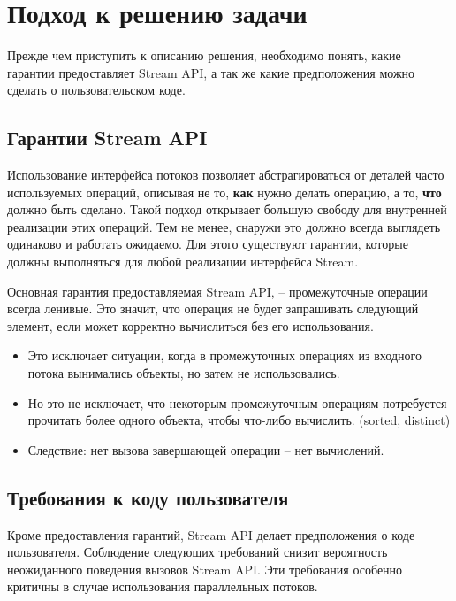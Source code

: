 \section{Подход к решению задачи}\label{chapter2}
Прежде чем приступить к описанию решения, необходимо понять, какие гарантии предоставляет Stream API, а так же какие предположения можно сделать о пользовательском коде.

\subsection{Гарантии Stream API}\label{java:guarantees}
Использование интерфейса потоков позволяет абстрагироваться от деталей часто используемых операций, описывая не то, \textbf{как} нужно делать операцию, а то, \textbf{что} должно быть сделано. Такой подход открывает большую свободу для внутренней реализации этих операций. Тем не менее, снаружи это должно всегда выглядеть одинаково и работать ожидаемо. Для этого существуют гарантии, которые должны выполняться для любой реализации интерфейса Stream. 

Основная гарантия предоставляемая Stream API, -- промежуточные операции всегда ленивые. Это значит, что операция не будет запрашивать следующий элемент, если может корректно вычислиться без его использования.
\begin{itemize}
	\item Это исключает ситуации, когда в промежуточных операциях из входного потока вынимались объекты, но затем не использовались.
	\item Но это не исключает, что некоторым промежуточным операциям потребуется прочитать более одного объекта, чтобы что-либо вычислить. (sorted, distinct)
	\item Следствие: нет вызова завершающей операции -- нет вычислений.
\end{itemize}

\subsection{Требования к коду пользователя} \label{code:demands}

Кроме предоставления гарантий, Stream API делает предположения о коде пользователя. Соблюдение следующих требований снизит вероятность неожиданного поведения вызовов Stream API. Эти требования особенно критичны в случае использования параллельных потоков.

